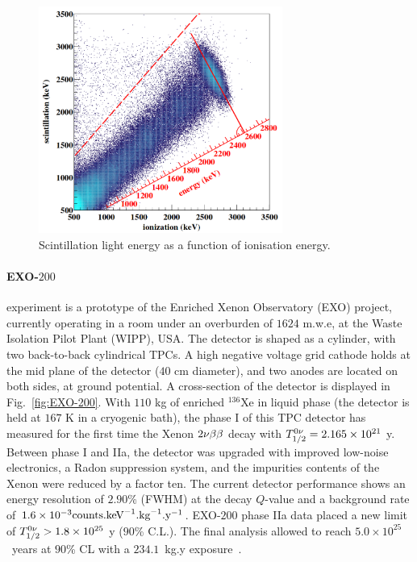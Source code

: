 \begin{figure}
  \centering
  \includegraphics[width=8cm]{neutrinophysics/fig_neutrinophysics/ionisation-to-scintillation_EXO-200.png}
  \caption{Scintillation light energy as a function of ionisation energy.
    \label{fig:ratio_EXO-200}}
\end{figure}

\paragraph{EXO-$200$} experiment is a prototype of the Enriched Xenon Observatory (EXO) project, currently operating in a room under an overburden of $1624$ m.w.e, at the Waste Isolation Pilot Plant (WIPP), USA.
The detector is shaped as a cylinder, with two back-to-back cylindrical TPCs.
A high negative voltage grid cathode holds at the mid plane of the detector ($40$ cm diameter), and two anodes are located on both sides, at ground potential.
A cross-section of the detector is displayed in Fig.~\ref{fig:EXO-200}.
With $110$ kg of enriched $^{136}$Xe in liquid phase (the detector is held at $167$ K in a cryogenic bath), the phase I of this TPC detector has measured for the first time the Xenon $2\nu\beta\beta$ decay with $T_{1/2}^{0\nu}=2.165\times 10^{21}$ y.
Between phase I and IIa, the detector was upgraded with improved low-noise electronics, a Radon suppression system, and the impurities contents of the Xenon were reduced by a factor ten.
The current detector performance shows an energy resolution of $2.90$\% (FWHM) at the decay $Q$-value and a background rate of $1.6\times 10^{-3}\text{counts.keV}^{-1}\text{.kg}^{-1}\text{.y}^{-1}$.
EXO-$200$ phase IIa data placed a new limit of $T_{1/2}^{0\nu}>1.8\times 10^{25}$ y ($90$\% C.L.).
The final analysis allowed to reach $5.0\times 10^{25}$~years at $90$\% CL with a $234.1$~kg.y exposure~\cite{art:EXO200_2019}.

